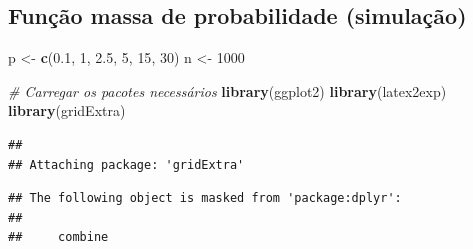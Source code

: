 \documentclass[
]{book}
\newenvironment{Shaded}{\begin{snugshade}}{\end{snugshade}}
\newcommand{\CommentTok}[1]{\textcolor[rgb]{0.56,0.35,0.01}{\textit{#1}}}
\newcommand{\DecValTok}[1]{\textcolor[rgb]{0.00,0.00,0.81}{#1}}
\newcommand{\FloatTok}[1]{\textcolor[rgb]{0.00,0.00,0.81}{#1}}
\newcommand{\FunctionTok}[1]{\textcolor[rgb]{0.13,0.29,0.53}{\textbf{#1}}}
\newcommand{\NormalTok}[1]{#1}
\newcommand{\OtherTok}[1]{\textcolor[rgb]{0.56,0.35,0.01}{#1}}
\begin{document}
\subsection{Função massa de probabilidade (simulação)}\label{funuxe7uxe3o-massa-de-probabilidade-simulauxe7uxe3o-1}

\begin{Shaded}
\begin{Highlighting}[]
\NormalTok{p }\OtherTok{\textless{}{-}} \FunctionTok{c}\NormalTok{(}\FloatTok{0.1}\NormalTok{, }\DecValTok{1}\NormalTok{, }\FloatTok{2.5}\NormalTok{, }\DecValTok{5}\NormalTok{, }\DecValTok{15}\NormalTok{, }\DecValTok{30}\NormalTok{)}
\NormalTok{n }\OtherTok{\textless{}{-}} \DecValTok{1000}

\CommentTok{\# Carregar os pacotes necessários}
\FunctionTok{library}\NormalTok{(ggplot2)}
\FunctionTok{library}\NormalTok{(latex2exp)}
\FunctionTok{library}\NormalTok{(gridExtra)}
\end{Highlighting}
\end{Shaded}

\begin{verbatim}
## 
## Attaching package: 'gridExtra'
\end{verbatim}

\begin{verbatim}
## The following object is masked from 'package:dplyr':
## 
##     combine
\end{verbatim}
\end{document}
